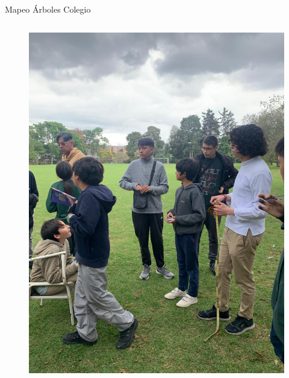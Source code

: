 \documentclass{beamer}
\begin{document}
\begin{frame}{Mapeo Árboles Colegio}

  \begin{columns}
    \begin{column}{.5\textwidth}
      \begin{figure}
        \centering
        \includegraphics[width=\textwidth]{img/Mapeo1.jpg}
      \end{figure}
    \end{column}


\end{columns}
\end{frame}
\end{document}
